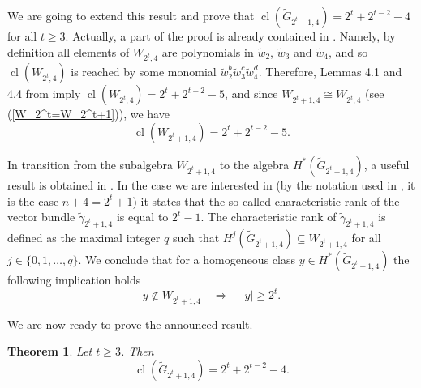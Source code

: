 \documentclass{amsart}
\newtheorem{theorem}{Theorem}[section]
\theoremstyle{definition}
\theoremstyle{remark}
\numberwithin{equation}{section}
\newcommand{\ges}{\geqslant}
\newcommand{\gr}{\widetilde G}
\newcommand{\w}{\widetilde w}
\newcommand{\cl}{\operatorname{cl}}
\renewcommand{\ge}{\geqslant}
\begin{document}
We are going to extend this result and prove that $\cl(\gr_{2^t+1,4})=2^t+2^{t-2}-4$ for all $t\ge3$. Actually, a part of the proof is already contained in \cite{Rusin}. Namely, by definition all elements of $W_{2^t,4}$ are polynomials in $\w_2$, $\w_3$ and $\w_4$, and so $\cl(W_{2^t,4})$ is reached by some monomial $\w_2^b\w_3^c\w_4^d$. Therefore, Lemmas 4.1 and 4.4 from \cite{Rusin} imply $\cl(W_{2^t,4})=2^t+2^{t-2}-5$, and since
 $W_{2^t+1,4}\cong W_{2^t,4}$ (see (\ref{W_2^t=W_2^t+1})), we have
 \begin{equation}\label{clW}
     \cl(W_{2^t+1,4})=2^t+2^{t-2}-5.
 \end{equation}
 
 In transition from the subalgebra $W_{2^t+1,4}$ to the algebra $H^*(\gr_{2^t+1,4})$, a useful result is obtained in \cite[Theorem 6.6]{bane-marko}. In the case we are interested in (by the notation used in \cite{bane-marko}, it is the case $n+4=2^t+1$) it states that the so-called characteristic rank of the vector bundle $\widetilde\gamma_{2^t+1,4}$ is equal to $2^t-1$. The characteristic rank of $\widetilde\gamma_{2^t+1,4}$ is defined as the maximal integer $q$ such that $H^j(\gr_{2^t+1,4})\subseteq W_{2^t+1,4}$ for all $j\in\{0,1,\ldots,q\}$. We conclude that for a homogeneous class $y\in H^*(\gr_{2^t+1,4})$ the following implication holds
 \begin{equation}\label{charrank}
     y\notin W_{2^t+1,4} \quad \Longrightarrow \quad |y|\ge2^t.
 \end{equation}



We are now ready to prove the announced result.
\begin{theorem}\label{cor:cl(G2^t+1,4)}
    Let $t\ges 3$. Then
    \[\cl(\gr_{2^t+1,4}) = 2^t+2^{t-2} - 4.\]
\end{theorem}
\end{document}
